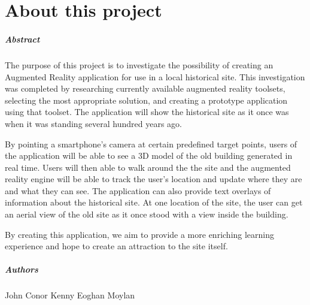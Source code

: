 
\graphicspath{ {/Home/Users/TheShockMaster/Desktop} }

\chapter*{About this project}

\paragraph{Abstract}
The purpose of this project is to investigate the possibility of creating an Augmented Reality application for use in a local historical site. This investigation was completed by researching currently available augmented reality toolsets, selecting the most appropriate solution, and creating a prototype application using that toolset. The application will show the historical site as it once was when it was standing several hundred years ago.

By pointing a smartphone’s camera at certain predefined target points, users of the application will be able to see a 3D model of the old building generated in real time. Users will then able to walk around the the site and the augmented reality engine will be able to track the user’s location and update where they are and what they can see. The application can also provide text overlays of information about the historical site. At one location of the site, the user can get an aerial view of the old site as it once stood with a view inside the building.

By creating this application, we aim to provide a more enriching learning experience and hope to create an attraction to the site itself.
\paragraph{Authors}
John Conor Kenny
Eoghan Moylan
